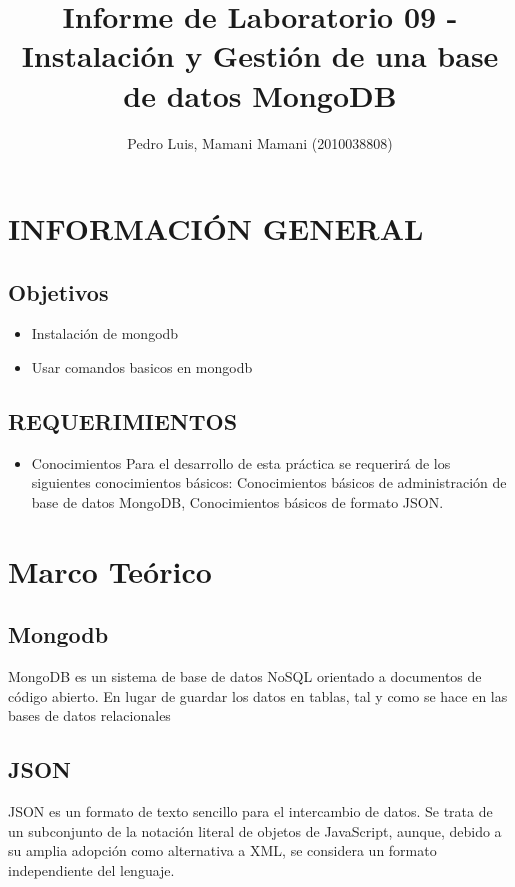 \documentclass[preprint,12pt]{elsarticle}
\begin{document}
	
	\begin{frontmatter} 

		\title{\huge Informe de Laboratorio 09 - Instalación y Gestión de una base de datos MongoDB}
		
		\author{Pedro Luis, Mamani Mamani         	(2010038808)} 
		\address{Escuela Profesional de Ingeniería de Sistemas}
		\address{Universidad Privada de Tacna}
		\address{Tacna, Perú}
	\end{frontmatter}



\section{INFORMACIÓN GENERAL} 

\subsection {\textbf{Objetivos}}
\begin{itemize}
	\item Instalación de mongodb
	\item Usar comandos basicos en mongodb
\end{itemize}

\subsection {\textbf{REQUERIMIENTOS}}
\begin{itemize}
	\item Conocimientos
Para el desarrollo de esta práctica se requerirá de los siguientes conocimientos básicos: Conocimientos básicos de administración de base de datos MongoDB, Conocimientos básicos de formato JSON.
\end{itemize}


\section{Marco Teórico}


\subsection {\textbf{Mongodb}}
MongoDB es un sistema de base de datos NoSQL orientado a documentos de código abierto. En lugar de guardar los datos en tablas, tal y como se hace en las bases de datos relacionales
\subsection {\textbf{JSON}}
JSON es un formato de texto sencillo para el intercambio de datos. Se trata de un subconjunto de la notación literal de objetos de JavaScript, aunque, debido a su amplia adopción como alternativa a XML, se considera un formato independiente del lenguaje.
\end{document}
